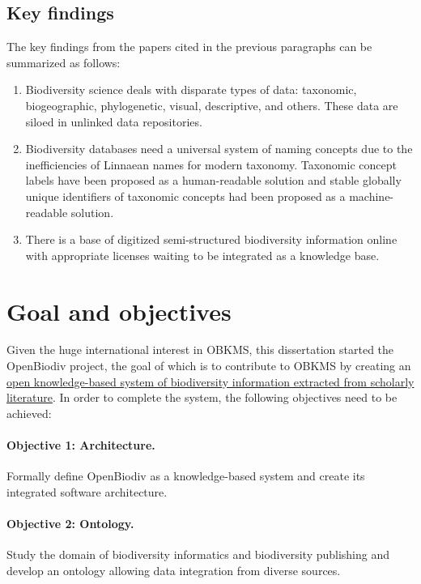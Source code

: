\subsection*{Key findings}

The key findings from the papers cited in the previous paragraphs can be summarized as follows:

\begin{enumerate}
  
\item{Biodiversity science deals with disparate types of data: taxonomic, biogeographic, phylogenetic, visual, descriptive, and others. These data are siloed in unlinked data repositories.}
  
\item{Biodiversity databases need a universal system of naming concepts due to the inefficiencies of Linnaean names for modern taxonomy. Taxonomic concept labels have been proposed as a human-readable solution and stable globally unique identifiers of taxonomic concepts had been proposed as a machine-readable solution.}

\item{There is a base of digitized semi-structured biodiversity information online with appropriate licenses waiting to be integrated as a knowledge base.}
\end{enumerate}


\section*{Goal and objectives}

Given the huge international interest in OBKMS, this dissertation started the OpenBiodiv project, the goal of which is to contribute to OBKMS by creating an \ul{open knowledge-based system of biodiversity information extracted from scholarly literature}. In order to complete the system, the following objectives need to be achieved:

\paragraph{Objective 1: Architecture.} Formally define OpenBiodiv as a knowledge-based system and create its integrated software architecture.
\paragraph{Objective 2: Ontology.} Study the domain of biodiversity informatics and biodiversity publishing and develop an ontology allowing data integration from diverse sources.
